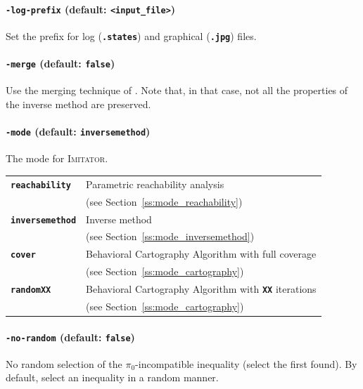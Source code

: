 \documentclass[a4paper,11pt]{article}
\newcommand{\imitator}{\textsc{Imitator}}
\newcommand{\code}[1]{\textbf{\texttt{#1}}}
\begin{document}
\paragraph{\code{-log-prefix} (default: \code{<input\_file>})}
Set the prefix for log (\code{.states}) and graphical (\code{.jpg}) files.


\paragraph{\code{-merge} (default: \code{false})}
Use the merging technique of \cite{AFS12}.
Note that, in that case, not all the properties of the inverse method are preserved.


\paragraph{\code{-mode} (default: \code{inversemethod})}
The mode for \imitator{}.

\begin{tabular}{@{} l @{\ \ } l}
 \code{reachability} & Parametric reachability analysis  \\
 & (see Section~\ref{ss:mode_reachability}) \\
 \code{inversemethod} & Inverse method \\
 & (see Section~\ref{ss:mode_inversemethod}) \\
 \code{cover} & Behavioral Cartography Algorithm with full coverage \\
 & (see Section~\ref{ss:mode_cartography}) \\
 \code{randomXX} & Behavioral Cartography Algorithm with \code{XX} iterations \\
  & (see Section~\ref{ss:mode_cartography}) \\
\end{tabular}



\paragraph{\code{-no-random} (default: \code{false})}
No random selection of the $\pi_0$-incompatible inequality (select the first found).
By default, select an inequality in a random manner.
\end{document}
